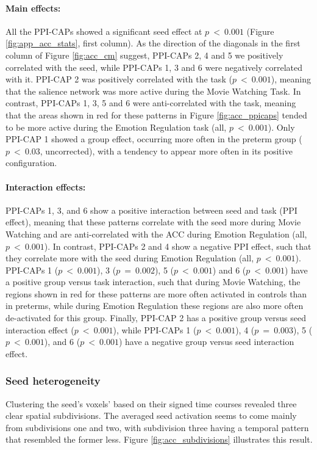 \paragraph{Main effects:}
All the PPI-CAPs showed a significant seed effect at $p~<~0.001$ (Figure \ref{fig:app_acc_stats}, first column). As the direction of the diagonals in the first column of Figure \ref{fig:acc_cm} suggest, PPI-CAPs 2, 4 and 5 we positively correlated with the seed, while PPI-CAPs 1, 3 and 6 were negatively correlated with it. PPI-CAP 2 was positively correlated with the task ($p~<~0.001$), meaning that the salience network was more active during the Movie Watching Task. In contrast, PPI-CAPs 1, 3, 5 and 6 were anti-correlated with the task, meaning that the areas shown in red for these patterns in Figure \ref{fig:acc_ppicaps} tended to be more active during the Emotion Regulation task (all, $p~<~0.001$). Only PPI-CAP 1 showed a group effect, occurring more often in the preterm group ( $p~<~0.03$, uncorrected), with a tendency to appear more often in its positive configuration.

\paragraph{Interaction effects:}
PPI-CAPs 1, 3, and 6 show  a positive interaction between seed and task (PPI effect), meaning that these patterns correlate with the seed more during Movie Watching and are anti-correlated with the ACC during  Emotion Regulation (all, $p~<~0.001$). In contrast, PPI-CAPs 2 and 4 show a negative PPI effect, such that they correlate more with the seed during Emotion Regulation (all, $p~<~0.001$). PPI-CAPs 1 ($p~<~0.001$), 3 ($p~=~0.002$), 5 ($p~<~0.001$) and 6 ($p~<~0.001$) have a positive group versus task interaction, such that during Movie Watching, the regions shown in red for these patterns are more often activated in controls than in preterms, while during Emotion Regulation these regions are also more often de-activated for this group. Finally, PPI-CAP 2 has a positive group versus seed interaction effect ($p~<~0.001$), while PPI-CAPs 1 ($p~<~0.001$), 4 ($p~=~0.003$), 5 ($p~<~0.001$), and 6 ($p~<~0.001$) have a negative group versus seed interaction effect.


\subsubsection{Seed heterogeneity}
Clustering the seed's voxels' based on their signed time courses revealed three clear spatial subdivisions. The averaged seed activation seems to come mainly from subdivisions one and two, with subdivision three having a temporal pattern that resembled the former less. Figure \ref{fig:acc_subdivisions} illustrates this result. 


